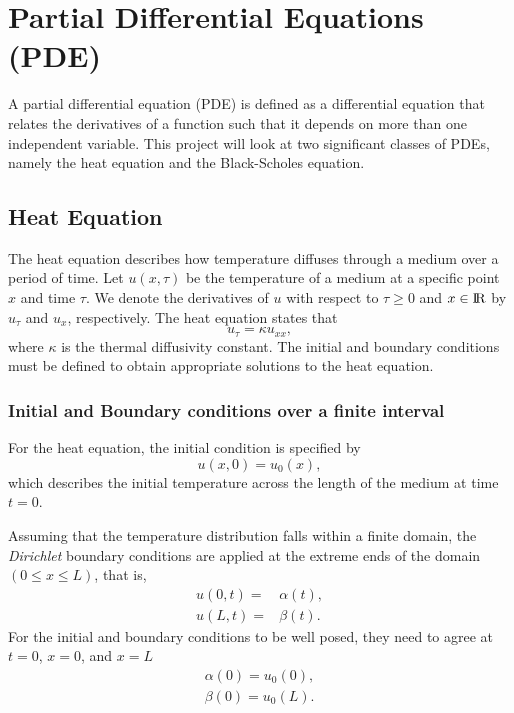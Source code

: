 
\section{Partial Differential Equations (PDE)}\label{sec:pde}
A partial differential equation (PDE) is defined as a differential equation that relates the derivatives
of a function such that it depends on more than one independent variable.\cite{olver_2014_pde}
This project will look at two significant classes of PDEs, namely the heat equation and the Black-Scholes equation.

\subsection{Heat Equation}\label{sec:heat}
The heat equation describes how temperature diffuses through a medium over a period of time. 
Let $u(x, \tau)$ be the temperature of a medium 
at a specific point $x$ and time $\tau$.
We denote the derivatives of $u$ with respect to $\tau\geq 0$ 
and $x\in{\rm I\!R}$ by $u_\tau$ and $u_x$, respectively.
The heat equation \cite{leveque_2007} states that 
\begin{equation}
u_{\tau} = \kappa u_{xx}, \label{eq:heat-equation}
\end{equation}
where $\kappa$ is the thermal diffusivity constant.
The initial and boundary conditions must be defined to obtain appropriate solutions to the heat equation. 

\subsubsection{Initial and Boundary conditions over a finite interval}
For the heat equation, the initial condition is specified by
\begin{equation}
u(x,0) = u_0(x),
\end{equation}
which describes the initial temperature across the length of the medium at time $t = 0$.

Assuming that the temperature distribution falls within a finite domain, the \textit{Dirichlet} boundary conditions are applied at the extreme ends of the domain \( (0 \leq x \leq L) \), that is,
\begin{subequations}
\begin{align}
u(0,t) ={}& \alpha(t),\\
u(L,t) ={}& \beta(t).
\end{align}
\end{subequations}
For the initial and boundary conditions to be 
well posed, they need to agree at $t=0$, $x=0$, 
and $x=L$
\begin{gather*} 
\alpha(0) = u_0(0), \\
\beta(0) = u_0(L).
\end{gather*} 

